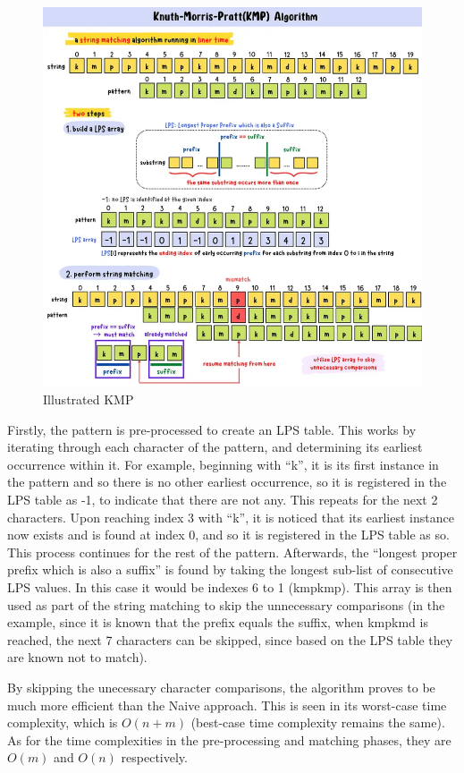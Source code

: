 \documentclass[12pt]{article}
\begin{document}
\begin{figure}[H]
	\includegraphics[scale=0.7]{kmp_figure}
	\centering
	\caption{Illustrated KMP \parencite{12}}
\end{figure}

Firstly, the pattern is pre-processed to create an LPS table. This works by iterating through each character of the pattern, and determining its earliest occurrence within it. For example, beginning with “k”, it is its first instance in the pattern and so there is no other earliest occurrence, so it is registered in the LPS table as -1, to indicate that there are not any. This repeats for the next 2 characters. Upon reaching index 3 with “k”, it is noticed that its earliest instance now exists and is found at index 0, and so it is registered in the LPS table as so. This process continues for the rest of the pattern. Afterwards, the “longest proper prefix which is also a suffix” is found by taking the longest sub-list of consecutive LPS values. In this case it would be indexes 6 to 1 (kmpkmp). This array is then used as part of the string matching to skip the unnecessary comparisons (in the example, since it is known that the prefix equals the suffix, when kmpkmd is reached, the next 7 characters can be skipped, since based on the LPS table they are known not to match).

By skipping the unecessary character comparisons, the algorithm proves to be much
more efficient than the Naive approach. This is seen in its worst-case time complexity,
which is $O(n + m)$ (best-case time complexity remains the same). As for the time complexities in the pre-processing and matching phases, they are $O(m)$ and $O(n)$ respectively.
\end{document}
